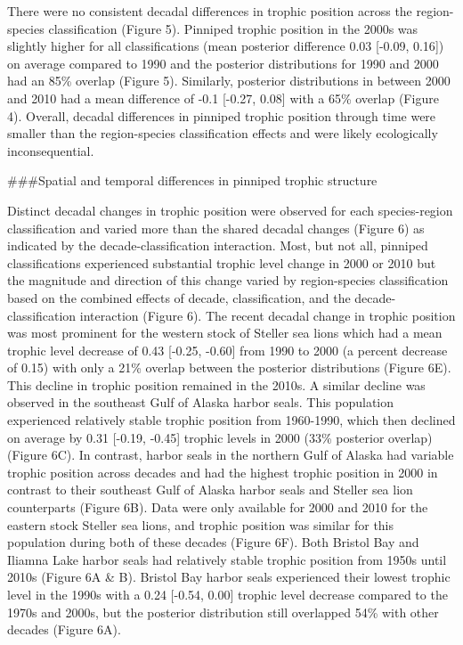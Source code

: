 \documentclass [11pt, proquest] {uwthesis}[2015/03/03]
\begin{document}
There were no consistent decadal differences in trophic position across the region-species classification (Figure 5). Pinniped trophic position in the 2000s was slightly higher for all classifications (mean posterior difference 0.03 {[}-0.09, 0.16{]}) on average compared to 1990 and the posterior distributions for 1990 and 2000 had an 85\% overlap (Figure 5). Similarly, posterior distributions in between 2000 and 2010 had a mean difference of -0.1 {[}-0.27, 0.08{]} with a 65\% overlap (Figure 4). Overall, decadal differences in pinniped trophic position through time were smaller than the region-species classification effects and were likely ecologically inconsequential.

\#\#\#Spatial and temporal differences in pinniped trophic structure

Distinct decadal changes in trophic position were observed for each species-region classification and varied more than the shared decadal changes (Figure 6) as indicated by the decade-classification interaction. Most, but not all, pinniped classifications experienced substantial trophic level change in 2000 or 2010 but the magnitude and direction of this change varied by region-species classification based on the combined effects of decade, classification, and the decade-classification interaction (Figure 6). The recent decadal change in trophic position was most prominent for the western stock of Steller sea lions which had a mean trophic level decrease of 0.43 {[}-0.25, -0.60{]} from 1990 to 2000 (a percent decrease of 0.15) with only a 21\% overlap between the posterior distributions (Figure 6E). This decline in trophic position remained in the 2010s. A similar decline was observed in the southeast Gulf of Alaska harbor seals. This population experienced relatively stable trophic position from 1960-1990, which then declined on average by 0.31 {[}-0.19, -0.45{]} trophic levels in 2000 (33\% posterior overlap) (Figure 6C). In contrast, harbor seals in the northern Gulf of Alaska had variable trophic position across decades and had the highest trophic position in 2000 in contrast to their southeast Gulf of Alaska harbor seals and Steller sea lion counterparts (Figure 6B). Data were only available for 2000 and 2010 for the eastern stock Steller sea lions, and trophic position was similar for this population during both of these decades (Figure 6F). Both Bristol Bay and Iliamna Lake harbor seals had relatively stable trophic position from 1950s until 2010s (Figure 6A \& B). Bristol Bay harbor seals experienced their lowest trophic level in the 1990s with a 0.24 {[}-0.54, 0.00{]} trophic level decrease compared to the 1970s and 2000s, but the posterior distribution still overlapped 54\% with other decades (Figure 6A).
\end{document}
